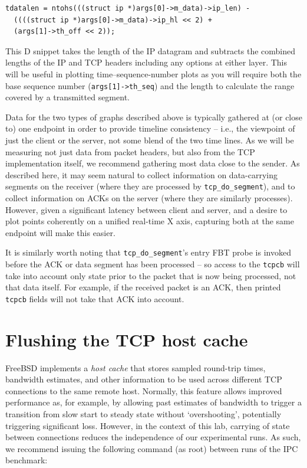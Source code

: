 \documentclass[a4paper,10pt]{article}
\begin{document}
\begin{verbatim}
tdatalen = ntohs(((struct ip *)args[0]->m_data)->ip_len) -
  ((((struct ip *)args[0]->m_data)->ip_hl << 2) +
  (args[1]->th_off << 2));
\end{verbatim}

This D snippet takes the length of the IP datagram and subtracts the combined
lengths of the IP and TCP headers including any options at either layer.
This will be useful in plotting time--sequence-number plots as you will
require both the base sequence number (\texttt{args[1]->th\_seq}) and the
length to calculate the range covered by a transmitted segment.

Data for the two types of graphs described above is typically gathered at (or
close to) one endpoint in order to provide timeline consistency -- i.e., the
viewpoint of just the client or the server, not some blend of the two
time lines.
As we will be measuring not just data from packet headers, but also from the
TCP implementation itself, we recommend gathering most data close to the
sender.
As described here, it may seem natural to collect information on data-carrying
segments on the receiver (where they are processed by
\texttt{tcp\_do\_segment}), and to collect information on ACKs on the server
(where they are similarly processes).
However, given a significant latency between client and server, and a desire
to plot points coherently on a unified real-time X axis, capturing both at the
same endpoint will make this easier.

It is similarly worth noting that \texttt{tcp\_do\_segment}'s entry FBT probe
is invoked before the ACK or data segment has been processed -- so access to
the \texttt{tcpcb} will take into account only state prior to the packet that
is now being processed, not that data itself.
For example, if the received packet is an ACK, then printed \texttt{tcpcb}
fields will not take that ACK into account.

\section*{Flushing the TCP host cache}

FreeBSD implements a \textit{host cache} that stores sampled round-trip times,
bandwidth estimates, and other information to be used across different TCP
connections to the same remote host.
Normally, this feature allows improved performance as, for example, by
allowing past estimates of bandwidth to trigger a transition from slow start
to steady state without `overshooting', potentially triggering significant
loss.
However, in the context of this lab, carrying of state between connections
reduces the independence of our experimental runs.
As such, we recommend issuing the following command (as root) between runs of
the IPC benchmark:
\end{document}
